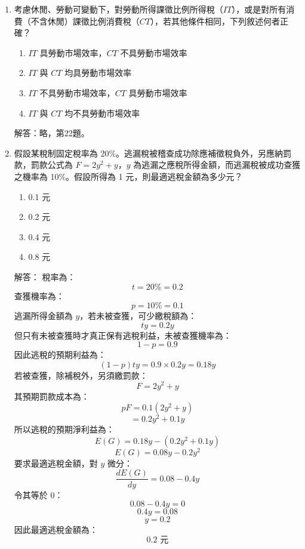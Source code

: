 \documentclass[12pt, a4paper]{article}
\begin{document}
\begin{enumerate}
    \item 考慮休閒、勞動可變動下，對勞動所得課徵比例所得稅（\(IT\)），或是對所有消費（不含休閒）課徵比例消費稅（\(CT\)），若其他條件相同，下列敘述何者正確？
    \begin{enumerate}[label=\Alph*.]
        \item \(IT\) 具勞動市場效率，\(CT\) 不具勞動市場效率
        \item \(IT\) 與 \(CT\) 均具勞動市場效率
        \item \(IT\) 不具勞動市場效率，\(CT\) 具勞動市場效率
        \item \(IT\) 與 \(CT\) 均不具勞動市場效率
    \end{enumerate}
    解答：略，第22題。

    \item 假設某稅制固定稅率為 20\%。逃漏稅被稽查成功除應補徵稅負外，另應納罰款，罰款公式為 \(F = 2y^2 + y\)，\(y\) 為逃漏之應稅所得金額，而逃漏稅被成功查獲之機率為 10\%。假設所得為 1 元，則最適逃稅金額為多少元？
    \begin{enumerate}[label=\Alph*.]
        \item 0.1 元
        \item 0.2 元
        \item 0.4 元
        \item 0.8 元
    \end{enumerate}
    解答：
    稅率為：
    \[
    t = 20\% = 0.2
    \]
    查獲機率為：
    \[
    p = 10\% = 0.1
    \]
    逃漏所得金額為 \(y\)，若未被查獲，可少繳稅額為：
    \[
    ty = 0.2y
    \]
    但只有未被查獲時才真正保有逃稅利益，未被查獲機率為：
    \[
    1-p = 0.9
    \]
    因此逃稅的預期利益為：
    \[
    (1-p)ty = 0.9 \times 0.2y = 0.18y
    \]
    若被查獲，除補稅外，另須繳罰款：
    \[
    F = 2y^2 + y
    \]
    其預期罰款成本為：
    \[
    pF = 0.1(2y^2+y)
    \]
    \[
    =0.2y^2+0.1y
    \]
    所以逃稅的預期淨利益為：
    \[
    E(G)=0.18y-(0.2y^2+0.1y)
    \]
    \[
    E(G)=0.08y-0.2y^2
    \]
    要求最適逃稅金額，對 \(y\) 微分：
    \[
    \frac{dE(G)}{dy}=0.08-0.4y
    \]
    令其等於 0：
    \[
    0.08-0.4y=0
    \]
    \[
    0.4y=0.08
    \]
    \[
    y=0.2
    \]
    因此最適逃稅金額為：
    \[
    \boxed{0.2\text{ 元}}
    \]


\end{enumerate}
\end{document}
